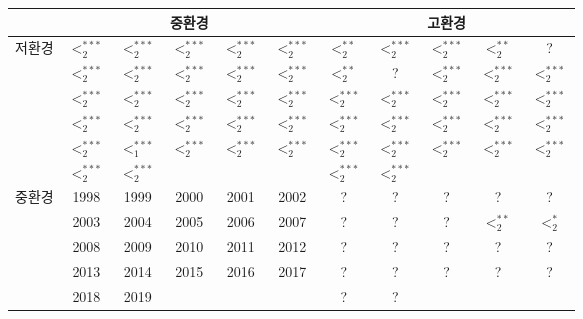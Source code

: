 \begin{tabular}{c|c|c|c|c|c|c|c|c|c|c}
\hline & \multicolumn{5}{c|}{중환경} & \multicolumn{5}{c}{고환경} \\
\hline \multirow{5}{*}{저환경} & $<_{2}^{***}$ & $<_{2}^{***}$ & $<_{2}^{***}$ & $<_{2}^{***}$ & $<_{2}^{***}$ & $<_{2}^{**}$ & $<_{2}^{***}$ & $<_{2}^{***}$ & $<_{2}^{**}$ & ? \\
\cline{2-11} & $<_{2}^{***}$ & $<_{2}^{***}$ & $<_{2}^{***}$ & $<_{2}^{***}$ & $<_{2}^{***}$ & $<_{2}^{**}$ & ? & $<_{2}^{***}$ & $<_{2}^{***}$ & $<_{2}^{***}$ \\
\cline{2-11} & $<_{2}^{***}$ & $<_{2}^{***}$ & $<_{2}^{***}$ & $<_{2 }^{***}$ & $<_{2 }^{***}$ & $<_{2 }^{***}$ & $<_{2}^{***}$ & $<_{2}^{***}$ & $<_{2}^{***}$ & $<_{2}^{***}$ \\
\cline{2-11} & $<_{2}^{***}$ & $<_{2}^{***}$ & $<_{2}^{***}$ & $<_{2}^{***}$ & $<_{2}^{***}$ & $<_{2}^{***}$ & $<_{2}^{***}$ & $<_{2}^{***}$ & $<_{2}^{***}$ & $<_{2}^{***}$ \\
\cline{2-11} & $<_{2}^{***}$ & $<_{1}^{***}$ & $<_{2}^{***}$ & $<_{2}^{***}$ & $<_{2}^{***}$ & $<_{2}^{***}$ & $<_{2}^{***}$ & $<_{2}^{***}$ & $<_{2}^{***}$ & $<_{2}^{***}$ \\
\cline{2-11} & $<_{2}^{***}$ & $<_{2}^{***}$ &  &  &  & $<_{2}^{***}$ & $<_{2}^{***}$ &  &  &  \\
\hline \multirow{5}{*}{중환경} & 1998 & 1999 & 2000 & 2001 & 2002 & ? & ? & ? & ? & ? \\
\cline{2-11} & 2003 & 2004 & 2005 & 2006 & 2007 & ? & ? & ? & $<_{2}^{**}$  &  $<_{2}^{*}$ \\
\cline{2-11} & 2008 & 2009 & 2010 & 2011 & 2012 & ? & ? & ? & ? & ? \\
\cline{2-11} & 2013 & 2014 & 2015 & 2016 & 2017 & ? & ? & ? & ? & ? \\
\cline{2-11} & 2018 & 2019 & &  &  & ? & ? &  &  &  \\
\hline
\end{tabular}